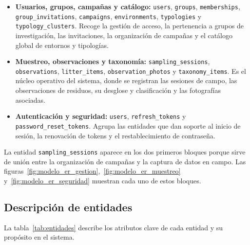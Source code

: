 \begin{itemize}
  \item \textbf{Usuarios, grupos, campañas y catálogo:} \texttt{users},
    \texttt{groups}, \texttt{memberships},\allowbreak{}
    \texttt{group\_}\allowbreak{}\texttt{invitations},
    \texttt{campaigns}, \texttt{environments}, \texttt{typologies} y
    \texttt{typology\_clusters}. Recoge la gestión de acceso, la pertenencia a grupos
    de investigación, las invitaciones, la organización de campañas y el catálogo
    global de entornos y tipologías.
  \item \textbf{Muestreo, observaciones y taxonomía:} \texttt{sampling\_sessions},
    \texttt{observations}, \texttt{litter\_items}, \texttt{observation\_photos} y
    \texttt{taxonomy\_items}. Es el núcleo operativo del sistema, donde se registran
    las sesiones de campo, las observaciones de residuos, su desglose y clasificación
    y las fotografías asociadas.
  \item \textbf{Autenticación y seguridad:} \texttt{users}, \texttt{refresh\_tokens}
    y \texttt{password\_reset\_tokens}. Agrupa las entidades que dan soporte al inicio
    de sesión, la renovación de tokens y el restablecimiento de contraseña.
\end{itemize}

La entidad \texttt{sampling\_sessions} aparece en los dos primeros bloques porque
sirve de unión entre la organización de campañas y la captura de datos en campo. Las
figuras~\ref{fig:modelo_er_gestion},~\ref{fig:modelo_er_muestreo}
y~\ref{fig:modelo_er_seguridad} muestran cada uno de estos bloques.



\subsection{Descripción de entidades}

La tabla~\ref{tab:entidades} describe los atributos clave de cada entidad y su
propósito en el sistema.

